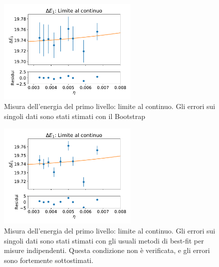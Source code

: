\documentclass[a4paper,11pt]{article}
\begin{document}
    
    
    \begin{figure}[h!]
        \centering
        \includegraphics[width=0.6\textwidth]{figure/energy_continuum_5.pdf}
        \caption{Misura dell'energia del primo livello: limite al continuo. Gli errori sui singoli dati sono stati stimati con il Bootstrap}
        \label{fig:energy_continuum}
    \end{figure}
    
    \begin{figure}[h!]
        \centering
        \includegraphics[width=0.6\textwidth]{figure/energy_continuum_5_wrong.pdf}
        \caption{Misura dell'energia del primo livello: limite al continuo. Gli errori sui singoli dati sono stati stimati con gli usuali metodi di best-fit per misure indipendenti. Questa condizione non è verificata, e gli errori sono fortemente sottostimati.}
        \label{fig:energy_continuum_wrong}
    \end{figure}



    

    
\end{document}
